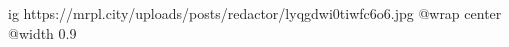 
 
 
 
 

\ifcmt
  ig https://mrpl.city/uploads/posts/redactor/lyqgdwi0tiwfc6o6.jpg
  @wrap center
  @width 0.9
\fi
